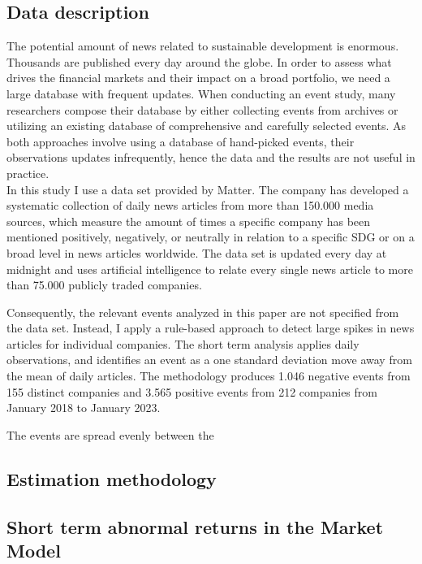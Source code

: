 
\subsection{Data description}

The potential amount of news related to sustainable development is enormous. Thousands are published every day around the globe. In order to assess what drives the financial markets and their impact on a broad portfolio, we need a large database with frequent updates. When conducting an event study, many researchers compose their database by either collecting events from archives or utilizing an existing database of comprehensive and carefully selected events. As both approaches involve using a database of hand-picked events, their observations updates infrequently, hence the data and the results are not useful in practice. \\
In this study I use a data set provided by Matter. The company has developed a systematic collection of daily news articles from more than 150.000 media sources, which measure the amount of times a specific company has been mentioned positively, negatively, or neutrally in relation to a specific SDG or on a broad level in news articles worldwide.   
The data set is updated every day at midnight and uses artificial intelligence to relate every single news article to more than 75.000 publicly traded companies. 

Consequently, the relevant events analyzed in this paper are not specified from the data set. Instead, I apply a rule-based approach to detect large spikes in news articles for individual companies. The short term analysis applies daily observations, and identifies an event as a one standard deviation move away from the mean of daily articles. The methodology produces 1.046 negative events from 155 distinct companies and 3.565 positive events from 212 companies from January 2018 to January 2023.  

The events are spread evenly between the  



\subsection{Estimation methodology}



\subsection{Short term abnormal returns in the Market Model} \label{ST_results}

